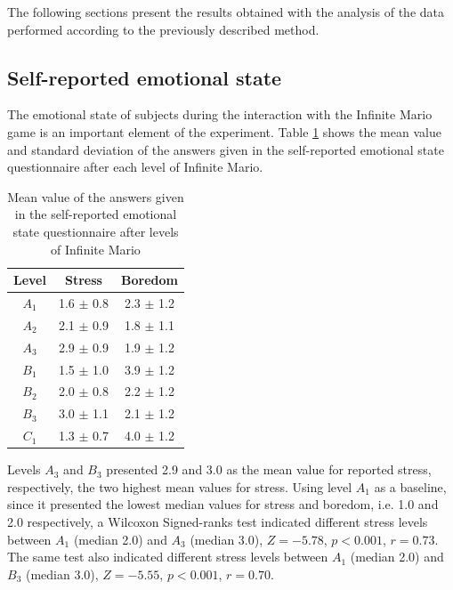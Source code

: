 The following sections present the results obtained with the analysis of the data performed according to the previously described method.

\subsection{Self-reported emotional state}

The emotional state of subjects during the interaction with the Infinite Mario game is an important element of the experiment. Table \ref{table:experiment2-mario-emotions} shows the mean value and standard deviation of the answers given in the self-reported emotional state questionnaire after each level of Infinite Mario.

\begin{table}[!htbp]
  \centering
  \caption{Mean value of the answers given in the self-reported emotional state questionnaire after levels of Infinite Mario}
  \label{table:experiment2-mario-emotions}
  \begin{tabular}{ccc}
    \hline
      \textbf{Level} & \textbf{Stress} & \textbf{Boredom} \\
    \hline
      $A_1$ & 1.6 $\pm$ 0.8 & 2.3 $\pm$ 1.2 \\
      $A_2$ & 2.1 $\pm$ 0.9 & 1.8 $\pm$ 1.1 \\
      $A_3$ & 2.9 $\pm$ 0.9 & 1.9 $\pm$ 1.2 \\
      $B_1$ & 1.5 $\pm$ 1.0 & 3.9 $\pm$ 1.2 \\
      $B_2$ & 2.0 $\pm$ 0.8 & 2.2 $\pm$ 1.2 \\
      $B_3$ & 3.0 $\pm$ 1.1 & 2.1 $\pm$ 1.2 \\
      $C_1$ & 1.3 $\pm$ 0.7 & 4.0 $\pm$ 1.2 \\
    \hline
  \end{tabular}
\end{table}

Levels $A_3$ and $B_3$ presented 2.9 and 3.0 as the mean value for reported stress, respectively, the two highest mean values for stress. Using level $A_1$ as a baseline, since it presented the lowest median values for stress and boredom, i.e. 1.0 and 2.0 respectively, a Wilcoxon Signed-ranks test indicated different stress levels between $A_1$ (median 2.0) and $A_3$ (median 3.0), $Z=-5.78$, $p < 0.001$, $r=0.73$. The same test also indicated different stress levels between $A_1$ (median 2.0) and $B_3$ (median 3.0), $Z=-5.55$, $p < 0.001$, $r=0.70$.

